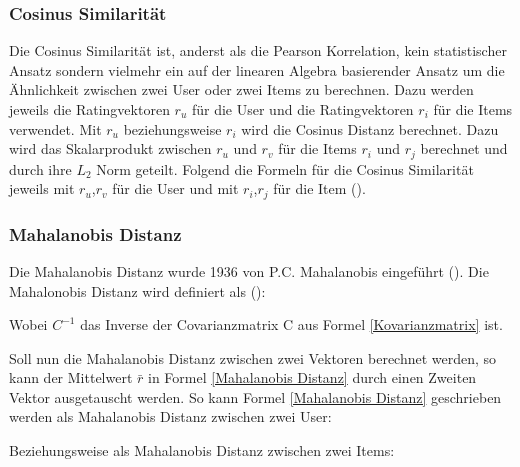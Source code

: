 \subsubsection{Cosinus Similarität}

Die Cosinus Similarität ist, anderst als die Pearson Korrelation, kein statistischer Ansatz sondern vielmehr ein auf der linearen Algebra basierender Ansatz um die Ähnlichkeit zwischen zwei User oder zwei Items zu berechnen. Dazu werden jeweils die Ratingvektoren $r_u$ für die User und die Ratingvektoren $r_i$ für die Items verwendet.
Mit $r_u$ beziehungsweise $r_i$ wird die Cosinus Distanz berechnet. Dazu wird das Skalarprodukt zwischen $r_u$ und $r_v$ für die Items $r_i$ und $r_j$ berechnet und durch ihre $L_2$ Norm geteilt.
Folgend die Formeln für die Cosinus Similarität jeweils mit $r_u$,$r_v$ für die User und mit $r_i$,$r_j$ für die Item (\cite{Ekstrand2011}).




\subsubsection{Mahalanobis Distanz}
Die Mahalanobis Distanz wurde 1936 von P.C. Mahalanobis eingeführt (\cite{mahalanobis1936generalized}).
Die Mahalonobis Distanz wird definiert als (\cite{DEMAESSCHALCK20001}):

Wobei $C^{-1}$ das Inverse der Covarianzmatrix C aus Formel  \ref{Kovarianzmatrix} ist.

Soll nun die Mahalanobis Distanz zwischen zwei Vektoren berechnet werden, so kann der Mittelwert $\bar{r}$ in Formel \ref{Mahalanobis Distanz} durch einen Zweiten Vektor ausgetauscht werden. So kann Formel \ref{Mahalanobis Distanz} geschrieben werden als Mahalanobis Distanz zwischen zwei User:


Beziehungsweise als Mahalanobis Distanz zwischen zwei Items:



